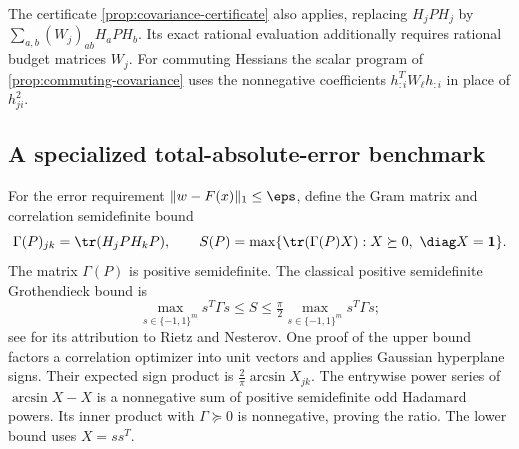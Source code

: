 The certificate \cref{prop:covariance-certificate} also applies, replacing
$H_jPH_j$ by $\sum_{a,b}(W_j)_{ab}H_aPH_b$. Its exact rational
evaluation additionally requires rational budget matrices $W_j$.
For commuting Hessians the scalar program of
\cref{prop:commuting-covariance} uses the nonnegative
coefficients $h_{:i}^TW_\ell h_{:i}$ in place of $h_{ji}^2$.

\subsection{A specialized total-absolute-error benchmark}

For the error requirement $\|w-F(x)\|_1\le\eps$, define the Gram matrix
and correlation semidefinite bound
\begin{equation}\label{eq:l1-covariance}
 \Gamma(P)_{jk}=\tr(H_jPH_kP),\qquad
 S(P)=\max\{\tr(\Gamma(P)X):X\succeq0,\ \diag X=\mathbf1\}.
\end{equation}
The matrix $\Gamma(P)$ is positive semidefinite. The classical positive
semidefinite Grothendieck bound is
\begin{equation}\label{eq:psd-grothendieck}
 \max_{s\in\{-1,1\}^m}s^T\Gamma s
 \le S\le\tfrac\pi2\max_{s\in\{-1,1\}^m}s^T\Gamma s;
\end{equation}
see \citet{briet2010} for its attribution to Rietz and Nesterov.
One proof of the upper bound factors a correlation optimizer into unit
vectors and applies Gaussian hyperplane signs. Their expected sign product
is $\frac2\pi\arcsin X_{jk}$. The entrywise power series of
$\arcsin X-X$ is a nonnegative sum of positive semidefinite odd Hadamard
powers. Its inner product with $\Gamma\succeq0$ is nonnegative, proving
the ratio. The lower bound uses $X=ss^T$.

